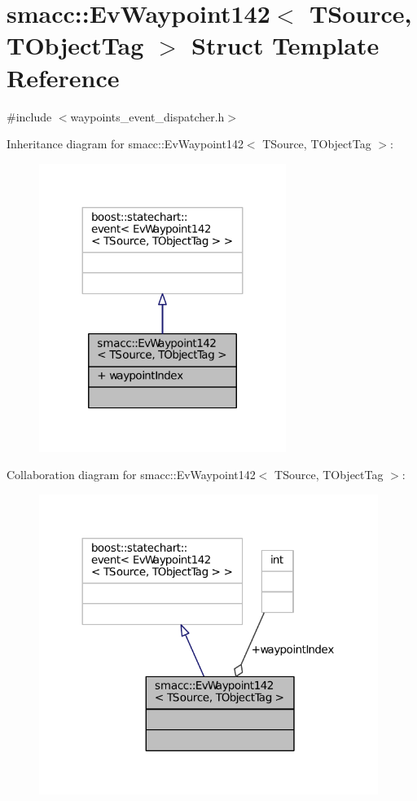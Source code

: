 \hypertarget{structsmacc_1_1EvWaypoint142}{}\section{smacc\+:\+:Ev\+Waypoint142$<$ T\+Source, T\+Object\+Tag $>$ Struct Template Reference}
\label{structsmacc_1_1EvWaypoint142}


{\ttfamily \#include $<$waypoints\+\_\+event\+\_\+dispatcher.\+h$>$}



Inheritance diagram for smacc\+:\+:Ev\+Waypoint142$<$ T\+Source, T\+Object\+Tag $>$\+:
\nopagebreak
\begin{figure}[H]
\begin{center}
\leavevmode
\includegraphics[width=227pt]{structsmacc_1_1EvWaypoint142__inherit__graph}
\end{center}
\end{figure}


Collaboration diagram for smacc\+:\+:Ev\+Waypoint142$<$ T\+Source, T\+Object\+Tag $>$\+:
\nopagebreak
\begin{figure}[H]
\begin{center}
\leavevmode
\includegraphics[width=312pt]{structsmacc_1_1EvWaypoint142__coll__graph}
\end{center}
\end{figure}
